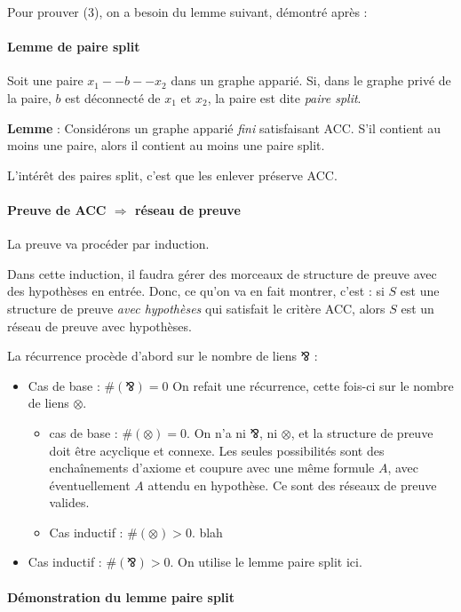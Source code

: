 \documentclass[a4paper, 11pt]{article}
\newcommand{\parr}{\mathbin{⅋}}
\begin{document}
Pour prouver (3), on a besoin du lemme suivant, démontré après :

\paragraph{Lemme de paire split} Soit une paire $x_1 -- b -- x_2$ dans un graphe apparié. Si, dans le graphe privé de la paire, $b$ est déconnecté de $x_1$ et $x_2$, la paire est dite \emph{paire split}.

\textbf{Lemme} : Considérons un graphe apparié \emph{fini} satisfaisant ACC. S'il contient au moins une paire, alors il contient au moins une paire split.

L'intérêt des paires split, c'est que les enlever préserve ACC.

\paragraph{Preuve de ACC $\Rightarrow$ réseau de preuve} La preuve va procéder par induction.

Dans cette induction, il faudra gérer des morceaux de structure de preuve avec des hypothèses en entrée. Donc, ce qu'on va en fait montrer, c'est : si $S$ est une structure de preuve \emph{avec hypothèses} qui satisfait le critère ACC, alors $S$ est un réseau de preuve avec hypothèses.

La récurrence procède d'abord sur le nombre de liens $\parr$ :
\begin{itemize}
\item Cas de base : $\#(\parr) = 0$
  On refait une récurrence, cette fois-ci sur le nombre de liens $\otimes$.
  \begin{itemize}
  \item cas de base : $\#(\otimes) = 0$. On n'a ni $\parr$, ni $\otimes$, et la structure de preuve doit être acyclique et connexe. Les seules possibilités sont des enchaînements d'axiome et coupure avec une même formule $A$, avec éventuellement $A$ attendu en hypothèse. Ce sont des réseaux de preuve valides.
  \item Cas inductif : $\#(\otimes) > 0$. blah
  \end{itemize}
\item Cas inductif : $\#(\parr) > 0$. On utilise le lemme paire split ici.
\end{itemize}

\paragraph{Démonstration du lemme paire split}
\end{document}
